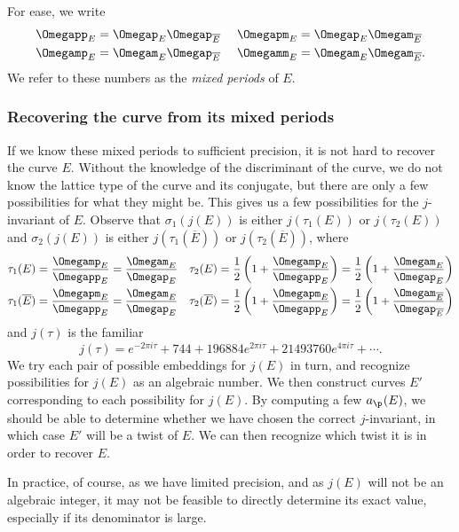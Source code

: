 \documentclass{amsart}
\newcommand{\ap}[1]{a_{\p_{#1}}}
\newcommand{\Ebar}{\overline{E}}
\begin{document}
For ease, we write
\begin{align*}
\Omegapp_E &= \Omegap_E\Omegap_{\Ebar}& \ \Omegapm_E &= \Omegap_E\Omegam_{\Ebar} \\
\Omegamp_E &= \Omegam_E\Omegap_{\Ebar}& \ \Omegamm_E &= \Omegam_E\Omegam_{\Ebar}.
\end{align*}
We refer to these numbers as the {\em mixed periods} of $E$.

\subsubsection{Recovering the curve from its mixed periods}
If we know these mixed periods to sufficient precision, it is not hard
to recover the curve $E$. Without the knowledge of the discriminant
of the curve, we do not know the lattice type of the curve and its
conjugate, but there are only a few possibilities for what they might
be. This gives us a few possibilities for the $j$-invariant of
$E$. Observe that $\sigma_1(j(E))$ is either $j(\tau_1(E))$ or $j(\tau_2(E))$
and $\sigma_2(j(E))$ is either $j(\tau_1(\Ebar))$ or $j(\tau_2(\Ebar))$,
where
\begin{align*}
    \tau_1(E) &= \frac{\Omegamp_E}{\Omegapp_E} = \frac{\Omegam_E}{\Omegap_E}&  \tau_2(E) &= \frac{1}{2}\left(1 + \frac{\Omegamp_E}{\Omegapp_E}\right) = \frac{1}{2}\left(1 + \frac{\Omegam_E}{\Omegap_E}\right) \\
    \tau_1(\Ebar) &= \frac{\Omegapm_E}{\Omegapp_E} = \frac{\Omegam_E}{\Omegap_E} &    \tau_2(\Ebar) &= \frac{1}{2}\left(1 + \frac{\Omegapm_E}{\Omegapp_E}\right) = \frac{1}{2}\left(1 + \frac{\Omegam_{\Ebar}}{\Omegap_{\Ebar}}\right)
\end{align*}
and $j(\tau)$ is the familiar
\[
    j(\tau) = e^{-2\pi i \tau} + 744 + 196884e^{2\pi i \tau} + 21493760e^{4\pi i \tau} + \cdots.
\]
We try each pair of possible embeddings for $j(E)$ in turn, and recognize
possibilities for $j(E)$ as an algebraic number. We then construct curves $E'$
corresponding to each possibility for $j(E)$. By computing a few $\ap{}(E)$, we
should be able to determine whether we have chosen the correct $j$-invariant,
in which case $E'$ will be a twist of $E$. We can then recognize which twist it is
in order to recover $E$.

In practice, of course, as we have limited precision, and as $j(E)$ will not be
an algebraic integer, it may not be feasible to directly determine its exact value,
especially if its denominator is large.
\end{document}
